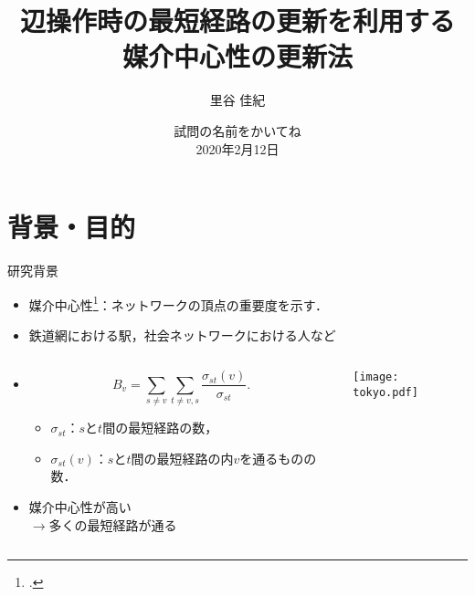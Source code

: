 \documentclass[dvipdfmx,fleqn]{beamer}
\title[媒介中心性更新法]{辺操作時の最短経路の更新を利用する \\ 媒介中心性の更新法}
\author[里谷]{里谷 佳紀}
\institute[情数工研]{情報数理工学研究室}
\date[試問]{\alert{試問の名前をかいてね} \\ 2020年2月12日}
\begin{document}
\makeIMELABtitle

\section{背景・目的}
\begin{frame}[t]{研究背景}
  \begin{itemize}
  \item \alert{媒介中心性}\footcite{01Freeman1977}：ネットワークの頂点の重要度を示す．
  \item[] 鉄道網における駅，社会ネットワークにおける人など
  \end{itemize}
  \begin{columns}[T]
    \begin{column}{.49\textwidth}
      \begin{itemize}
      \item[] \begin{equation*}
        B_v=\sum_{s\neq v}\sum_{t\neq v,s}\frac{\sigma_{st}(v)}{\sigma_{st}}.
      \end{equation*}
        \begin{itemize}
        \item $\sigma_{st}$：$s$と$t$間の最短経路の数，
        \item $\sigma_{st}(v)$：$s$と$t$間の最短経路の内$v$を通るものの数．
        \end{itemize}
        \medskip
      \item 媒介中心性が高い\\$\rightarrow$多くの最短経路が通る
      \end{itemize}
    \end{column}
    \begin{column}{.49\textwidth}
      \texttt{[image: tokyo.pdf]}
    \end{column}
  \end{columns}
\end{frame}
\end{document}
